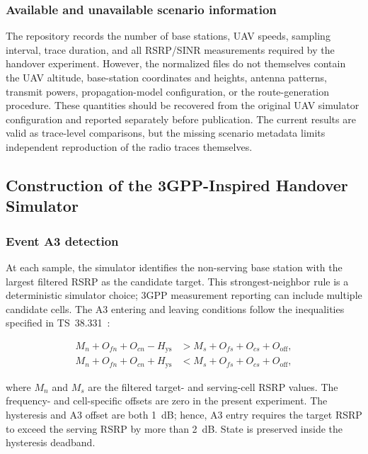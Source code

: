 \subsubsection{Available and unavailable scenario information}

The repository records the number of base stations, UAV speeds, sampling
interval, trace duration, and all RSRP/SINR measurements required by the
handover experiment. However, the normalized files do not themselves contain
the UAV altitude, base-station coordinates and heights, antenna patterns,
transmit powers, propagation-model configuration, or the route-generation
procedure. These quantities should be recovered from the original UAV
simulator configuration and reported separately before publication. The
current results are valid as trace-level comparisons, but the missing scenario
metadata limits independent reproduction of the radio traces themselves.

\subsection{Construction of the 3GPP-Inspired Handover Simulator}
\label{subsec:a3-simulator}

\subsubsection{Event A3 detection}

At each sample, the simulator identifies the non-serving base station with the
largest filtered RSRP as the candidate target. This strongest-neighbor rule is
a deterministic simulator choice; 3GPP measurement reporting can include
multiple candidate cells. The A3 entering and leaving conditions follow the
inequalities specified in TS~38.331~\cite{3gpp38331}:

\begin{align}
M_n + O_{fn}+O_{cn}-H_{\mathrm{ys}}
    &> M_s+O_{fs}+O_{cs}+O_{\mathrm{off}}, \\
M_n + O_{fn}+O_{cn}+H_{\mathrm{ys}}
    &< M_s+O_{fs}+O_{cs}+O_{\mathrm{off}},
\end{align}

where $M_n$ and $M_s$ are the filtered target- and serving-cell RSRP values.
The frequency- and cell-specific offsets are zero in the present experiment.
The hysteresis and A3 offset are both 1~dB; hence, A3 entry requires the target
RSRP to exceed the serving RSRP by more than 2~dB. State is preserved inside
the hysteresis deadband.

